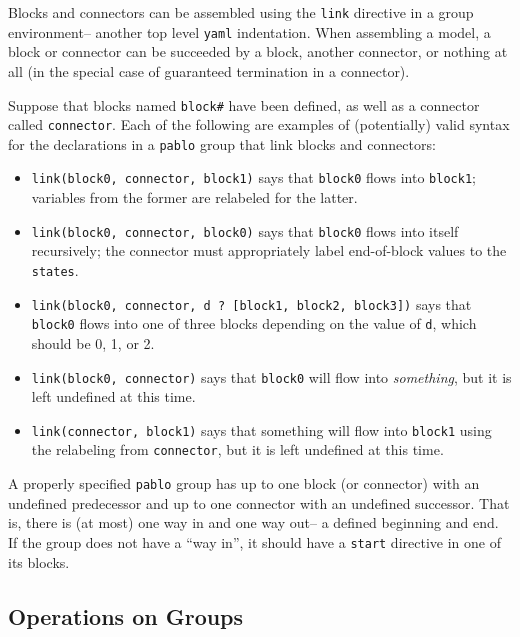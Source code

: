 \documentclass[12pt,pdftex,letterpaper]{article}
\begin{document}
Blocks and connectors can be assembled using the \texttt{link} directive in a group environment-- another top level \texttt{yaml} indentation. When assembling a model, a block or connector can be succeeded by a block, another connector, or nothing at all (in the special case of guaranteed termination in a connector).

Suppose that blocks named \texttt{block\#} have been defined, as well as a connector called \texttt{connector}. Each of the following are examples of (potentially) valid syntax for the declarations in a \texttt{pablo} group that link blocks and connectors:

\begin{itemize}
	\item \texttt{link(block0, connector, block1)} says that \texttt{block0} flows into \texttt{block1}; variables from the former are relabeled for the latter.
	
	\item \texttt{link(block0, connector, block0)} says that \texttt{block0} flows into itself recursively; the connector must appropriately label end-of-block values to the \texttt{states}.
	
	\item \texttt{link(block0, connector, d ? [block1, block2, block3])} says that \texttt{block0} flows into one of three blocks depending on the value of \texttt{d}, which should be 0, 1, or 2.
		
	\item \texttt{link(block0, connector)} says that \texttt{block0} will flow into \textit{something}, but it is left undefined at this time.
	
	\item \texttt{link(connector, block1)} says that something will flow into \texttt{block1} using the relabeling from \texttt{connector}, but it is left undefined at this time.
\end{itemize}

A properly specified \texttt{pablo} group has up to one block (or connector) with an undefined predecessor and up to one connector with an undefined successor. That is, there is (at most) one way in and one way out-- a defined beginning and end. If the group does not have a ``way in'', it should have a \texttt{start} directive in one of its blocks.


\subsection{Operations on Groups}
\end{document}
